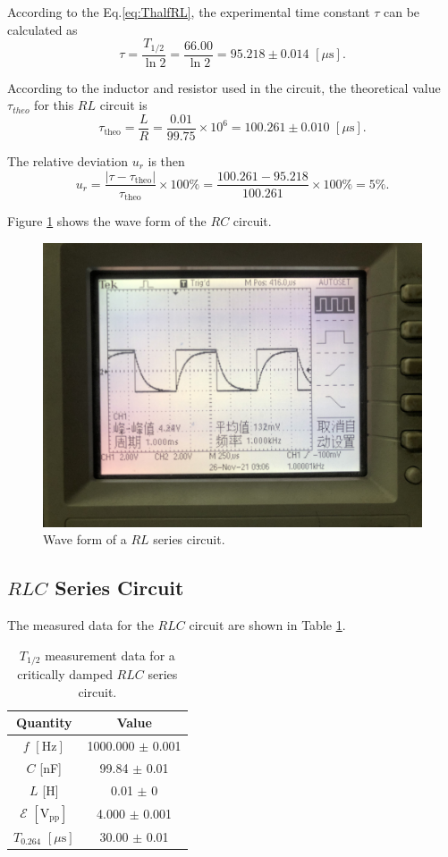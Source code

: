 \documentclass{article}
\begin{document}
According to the Eq.\eqref{eq:ThalfRL}, the experimental time constant $\tau$ can be calculated as
$$\tau = \frac{T_{1/2}}{\ln 2} = \frac{66.00}{\ln 2} = 95.218 \pm 0.014 \,\,[\mu\text{s}].$$

According to the inductor and resistor used in the circuit, the theoretical value $\tau_{theo}$ for this $RL$ circuit is
$$\tau_{\text{theo}} = \frac{L}{R} = \frac{0.01}{99.75} \times 10^{6} = 100.261 \pm 0.010 \,\,[\mu\text{s}].$$

The relative deviation $u_r$ is then
$$u_r = \frac{|\tau-\tau_{\text{theo}}|}{\tau_{\text{theo}}} \times 100\% = \frac{100.261 - 95.218}{100.261} \times 100\% = 5\%.$$

Figure \ref{RLwave} shows the wave form of the $RC$ circuit.

\begin{figure}[H]
\centering
\includegraphics[scale=0.075]{RLwave.jpeg}
\caption{Wave form of a $RL$ series circuit.}\label{RLwave}
\end{figure}

\subsection{$RLC$ Series Circuit}

The measured data for the $RLC$ circuit are shown in Table \ref{TableRLC}.

\begin{table}[H]\centering
    \begin{tabular}{c|c}
    \toprule
            Quantity & Value \\
        \midrule
        $f\,\,[\text{Hz}]$ & 1000.000 $\pm$ 0.001 \\
        $C$ [nF] & 99.84 $\pm$ 0.01 \\
        $L$ [H] & 0.01 $\pm$ 0 \\
        $\mathcal{E}\,\,[\text{V}_{\text{pp}}]$ & 4.000 $\pm$ 0.001    \\
        $T_{0.264}\,\,[\mu\text{s}]$  & 30.00 $\pm$ 0.01  \\
        \bottomrule
    \end{tabular}
    \caption{$T_{1/2}$ measurement data for a critically damped $RLC$ series circuit.}\label{TableRLC}
\end{table}
\end{document}
